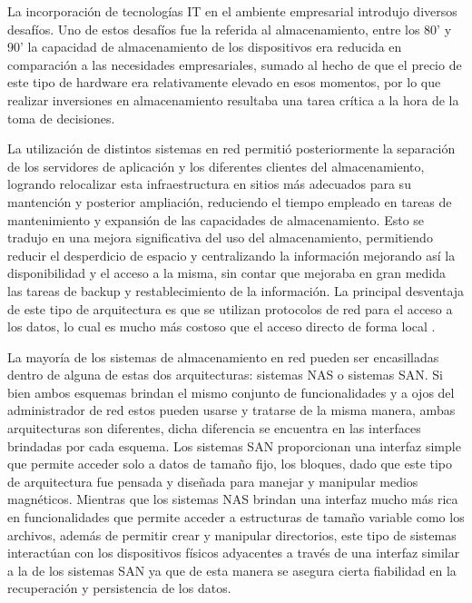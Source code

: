 \documentclass[a4paper,10pt]{article}
\begin{document}
	La incorporación de tecnologías IT en el ambiente empresarial introdujo diversos desafíos. Uno de estos desafíos fue la referida al almacenamiento, entre los 80’ y 90’ la capacidad de almacenamiento de los dispositivos era reducida en comparación a las necesidades empresariales, sumado al hecho de que el precio de este tipo de hardware era relativamente elevado en esos momentos, por lo que realizar inversiones en almacenamiento resultaba una tarea crítica a la hora de la toma de decisiones.
	
	La utilización de distintos sistemas en red permitió posteriormente la separación de los servidores de aplicación y los diferentes clientes del almacenamiento, logrando relocalizar esta infraestructura en sitios más adecuados para su mantención y posterior ampliación, reduciendo el tiempo empleado en tareas de mantenimiento y expansión de las capacidades de almacenamiento. Esto se tradujo en una mejora significativa del uso del almacenamiento, permitiendo reducir el desperdicio de espacio y centralizando la información mejorando así la disponibilidad y el acceso a la misma, sin contar que mejoraba en gran medida las tareas de backup y restablecimiento de la información. La principal desventaja de este tipo de arquitectura es que se utilizan protocolos de red para el acceso a los datos, lo cual es mucho más costoso que el acceso directo de forma local \citep{Gibson_Van_Meter_2000}.
	
	La mayoría de los sistemas de almacenamiento en red pueden ser encasilladas dentro de alguna de estas dos arquitecturas: sistemas NAS o sistemas SAN. Si bien ambos esquemas brindan el mismo conjunto de funcionalidades y a ojos del administrador de red estos pueden usarse y tratarse de la misma manera, ambas arquitecturas son diferentes, dicha diferencia se encuentra en las interfaces brindadas por cada esquema. Los sistemas SAN proporcionan una interfaz simple que permite acceder solo a datos de tamaño fijo, los bloques, dado que este tipo de arquitectura fue pensada y diseñada para manejar y manipular medios magnéticos. Mientras que los sistemas NAS brindan una interfaz mucho más rica en funcionalidades que permite acceder a estructuras de tamaño variable como los archivos, además de permitir crear y manipular directorios, este tipo de sistemas interactúan con los dispositivos físicos adyacentes a través de una interfaz similar a la de los sistemas SAN ya que de esta manera se asegura cierta fiabilidad en la recuperación y persistencia de los datos.
	
\end{document}
